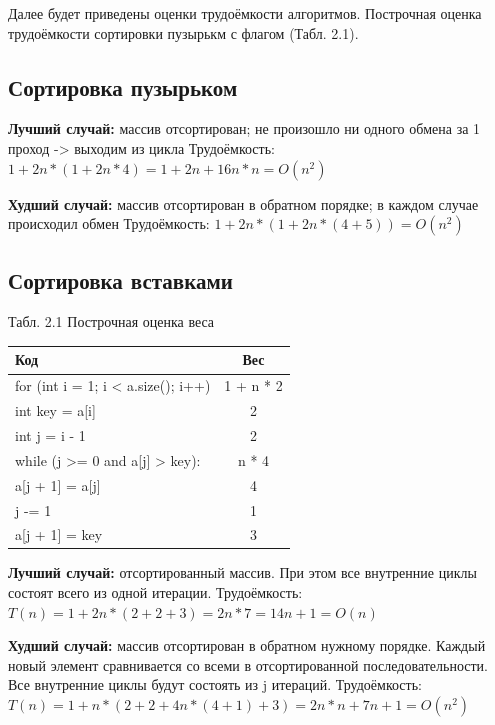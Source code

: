 \documentclass[12pt]{report}
\begin{document}
Далее будет приведены оценки трудоёмкости алгоритмов. Построчная оценка трудоёмкости сортировки пузырькм с флагом (Табл. 2.1).

\subsection{Сортировка пузырьком}
\textbf{Лучший случай:} массив отсортирован; не произошло ни одного обмена за 1 проход -> выходим из цикла \newline
Трудоёмкость: $1+2n*(1 + 2n*4) = 1+2n+16n*n=  O(n^{2})$

\textbf{Худший случай:} массив отсортирован в обратном порядке; в каждом случае происходил обмен\newline
Трудоёмкость: $1+2n*(1 + 2n*(4+5)) = O(n^2)$

\subsection{Сортировка вставками}
\begin{center}
Табл. 2.1 Построчная оценка веса
	\begin{tabular}{|l c|} 
 	\hline
	Код & Вес \\ [0.5ex] 
 	\hline
 	for (int i = 1; i < a.size(); i++) & 1 + n * 2\\
 	\hline
	int key = a[i] & 2\\
	\hline
	int j = i - 1 & 2\\
	\hline
	while (j >= 0 and a[j] > key): & n * 4\\
	\hline
	a[j + 1] = a[j] & 4\\
	\hline
	j -= 1 & 1\\
	\hline
	a[j + 1] = key & 3\\
	\hline
	\end{tabular}
\end{center}

\textbf{Лучший случай:} отсортированный массив. При этом все внутренние циклы состоят всего из одной итерации.\newline
Трудоёмкость: $T(n) = 1 + 2n * (2+2+3)  =  2n * 7 = 14n + 1 = O(n)$

\textbf{Худший случай:} массив отсортирован в обратном нужному порядке. Каждый новый элемент сравнивается со всеми в отсортированной последовательности. Все внутренние циклы будут состоять из j итераций. \newline
Трудоёмкость: $T(n) = 1+n*(2+2+4n*(4+1)+3) = 2n*n+7n+1 =  O(n^{2})$
\end{document}
